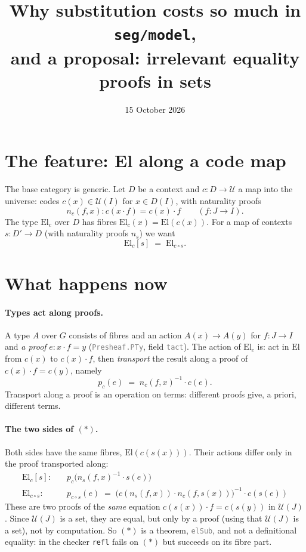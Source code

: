 \documentclass[11pt]{article}
\title{Why substitution costs so much in \texttt{seg/model},\\
and a proposal: irrelevant equality proofs in sets}
\date{15 October 2026}
\author{}
\newcommand{\seg}[1]{\textcolor{gray}{\texttt{\small #1}}}
\newcommand{\El}{\mathrm{El}}
\newcommand{\U}{\mathcal{U}}
\theoremstyle{remark}
\begin{document}
\maketitle

\section{The feature: El along a code map}

The base category is generic.  Let $D$ be a context and $c : D \to \U$ a
map into the universe: codes $c(x) \in \U(I)$ for $x \in D(I)$, with
naturality proofs
\[ n_c(f, x) : c(x \cdot f) = c(x)\cdot f \qquad (f : J \to I). \]
The type $\El_c$ over $D$ has fibres $\El_c(x) = \El(c(x))$.  For a map of
contexts $s : D' \to D$ (with naturality proofs $n_s$) we want
\[ \El_c[s] \;=\; \El_{c\circ s}. \tag{$\ast$} \]

\section{What happens now}

\paragraph{Types act along proofs.}  A type $A$ over $G$ consists of fibres
and an action $A(x) \to A(y)$ for $f : J\to I$ and \emph{a proof}
$e : x\cdot f = y$ (\seg{Presheaf.PTy}, field \seg{tact}).  The action of
$\El_c$ is: act in $\El$ from $c(x)$ to $c(x)\cdot f$, then \emph{transport}
the result along a proof of $c(x)\cdot f = c(y)$, namely
\[ p_c(e) \;=\; n_c(f,x)^{-1}\cdot c(e). \]
Transport along a proof is an operation on terms: different proofs give, a
priori, different terms.

\paragraph{The two sides of $(\ast)$.}  Both sides have the same fibres,
$\El(c(s(x)))$.  Their actions differ only in the proof transported along:
\begin{align*}
 \El_c[s]:&\quad p_c\big(n_s(f,x)^{-1}\cdot s(e)\big) \\
 \El_{c\circ s}:&\quad p_{c\circ s}(e) \;=\; \big(c(n_s(f,x))\cdot n_c(f, s(x))\big)^{-1}\cdot c(s(e))
\end{align*}
These are two proofs of the \emph{same} equation $c(s(x))\cdot f = c(s(y))$
in $\U(J)$.  Since $\U(J)$ is a set, they are equal, but only by a proof
(using that $\U(J)$ is a set), not by computation.  So $(\ast)$ is a
theorem, \seg{elSub}, and not a definitional equality: in the checker
\texttt{refl} fails on $(\ast)$ but succeeds on its fibre part.
\end{document}
